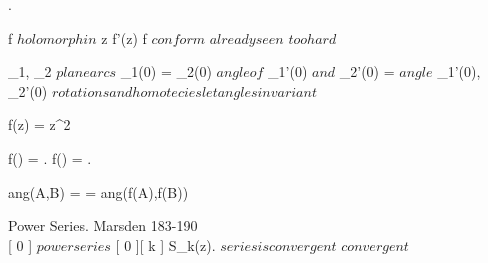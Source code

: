 \documentclass[../Main/main]{subfiles}
\begin{document}
{	
	{
		{
			.
			
		}
		\holds
		{
			f $holomorph in $ z \suchthat f'(z)  \ifandonlyif f $ conform $
		}
		\demonstration
		{
			\rightway
			{
				$ already seen $
			}
			\leftway
			{
				$ too hard $
			}	
		}
	}
	
	
	{
		{
			\gamma_1, \gamma_2 $ plane arcs $ \suchthat \gamma_1(0) = \gamma_2(0)
		}
		\holds
		{
			$ angle of $ \gamma_1'(0) $ and $ \gamma_2'(0) = $ angle $ \sigma_1'(0), \sigma_2'(0) 
		}
		\demonstration
		{
			$ rotations and homotecies let angles invariant $
		}
	}
	
	
	{
		{
			f(z) = z^2
		}
		{
			f() = .
			f() = .

			ang(A,B) = \pi {} = ang(f(A),f(B))
		}
	}
	
	
	Power Series. Marsden 183-190 \\

	{
		{
			[ 0 ] $ power series $
		}
		{
			[ 0 ][ k ]
		}
		\denote
		{
			S_k(z).
			$ series is convergent $ \as {} $ convergent $
		}
	}

	
	
	
	
	
	
	
	
	
	


	
	
	
	
	
	
	



}
\end{document}
